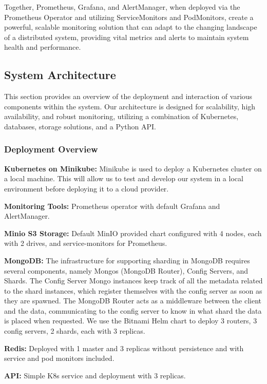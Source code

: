 \documentclass{report}
\begin{document}
    Together, Prometheus, Grafana, and AlertManager, when deployed via the Prometheus Operator and utilizing ServiceMonitors and PodMonitors, create a powerful, scalable monitoring solution that can adapt to the changing landscape of a distributed system, providing vital metrics and alerts to maintain system health and performance.

    \subsection{System Architecture}
    This section provides an overview of the deployment and interaction of various components within the system. Our architecture is designed for scalability, high availability, and robust monitoring, utilizing a combination of Kubernetes, databases, storage solutions, and a Python API.

    \subsubsection{Deployment Overview}

    \textbf{Kubernetes on Minikube:} Minikube is used to deploy a Kubernetes cluster on a local machine. This will allow us to test and develop our system in a local environment before deploying it to a cloud provider.

    \textbf{Monitoring Tools:} Prometheus operator with default Grafana and AlertManager.

    \textbf{Minio S3 Storage:} Default MinIO provided chart configured with 4 nodes, each with 2 drives, and service-monitors for Prometheus.

    \textbf{MongoDB:} The infrastructure for supporting sharding in MongoDB requires several components, namely Mongos (MongoDB Router), Config Servers, and Shards. The Config Server Mongo instances keep track of all the metadata related to the shard instances, which register themselves with the config server as soon as they are spawned. The MongoDB Router acts as a middleware between the client and the data, communicating to the config server to know in what shard the data is placed when requested. We use the Bitnami Helm chart to deploy 3 routers, 3 config servers, 2 shards, each with 3 replicas.

    \textbf{Redis:} Deployed with 1 master and 3 replicas without persistence and with service and pod monitors included.

    \textbf{API:} Simple K8s service and deployment with 3 replicas.
\end{document}
